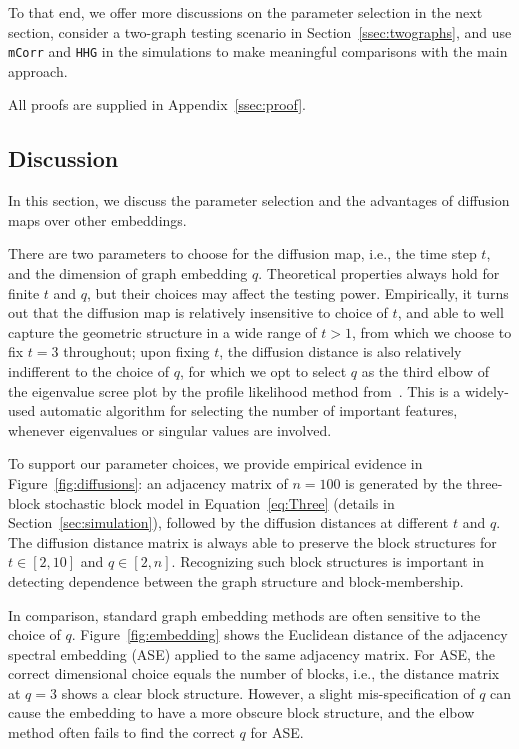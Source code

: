 \documentclass[12pt]{article}
\theoremstyle{definition}
\begin{document}
	To that end, we offer more discussions on the parameter selection in the next section, consider a two-graph testing scenario in Section~\ref{ssec:twographs}, and use \texttt{mCorr} and \texttt{HHG} in the simulations to make meaningful comparisons with the main approach.
	
	All proofs are supplied in Appendix~\ref{ssec:proof}.
	
	\subsection{Discussion}
	\label{ss:dis}
	
	In this section, we discuss the parameter selection and the advantages of diffusion maps over other embeddings. %
	
	There are two parameters to choose for the diffusion map, i.e., the time step $t$, and the dimension of graph embedding $q$. Theoretical properties always hold for finite $t$ and $q$, but their choices may affect the testing power. Empirically, it turns out that the diffusion map is relatively insensitive to choice of $t$, and able to well capture the geometric structure in a wide range of $t>1$, from which we choose to fix $t=3$ throughout; upon fixing $t$, the diffusion distance is also relatively indifferent to the choice of $q$, for which we opt to select $q$ as the third elbow of the eigenvalue scree plot by the profile likelihood method from~\cite{ZhuGhodsi2006}. This is a widely-used automatic algorithm for selecting the number of important features, whenever eigenvalues or singular values are involved. 
	
	To support our parameter choices, we provide empirical evidence in Figure~\ref{fig:diffusions}: an adjacency matrix of $n=100$ is generated by the three-block stochastic block model in Equation~\ref{eq:Three} (details in Section~\ref{sec:simulation}), followed by the diffusion distances at different $t$ and $q$. The diffusion distance matrix is always able to preserve the block structures for $t \in [2,10]$ and $q \in [2,n]$. Recognizing such block structures is important in detecting dependence between the graph structure and block-membership.
	
	In comparison, standard graph embedding methods are often sensitive to the choice of $q$. Figure~\ref{fig:embedding} shows the Euclidean distance of the adjacency spectral embedding (ASE) \citep{SussmanEtAl2012} applied to the same adjacency matrix. For ASE, the correct dimensional choice equals the number of blocks, i.e., the distance matrix at $q=3$ shows a clear block structure. However, a slight mis-specification of $q$ can cause the embedding to have a more obscure block structure, and the elbow method often fails to find the correct $q$ for ASE.
	
\end{document}
